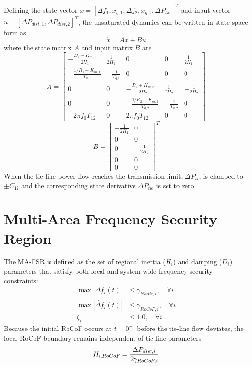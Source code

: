 \documentclass[lettersize,journal]{IEEEtran}
\begin{document}
Defining the state vector $x = [\Delta f_1, x_{g,1}, \Delta f_2, x_{g,2}, \Delta P_{tie}]^T$ and input vector $u = [\Delta P_{dist,1}, \Delta P_{dist,2}]^T$, the unsaturated dynamics can be written in state-space form as
\begin{equation}
\dot{x} = A x + B u
\end{equation}
where the state matrix $A$ and input matrix $B$ are
{\small
\begin{equation*}
A = \begin{bmatrix}
-\frac{D_1 + K_{m,1}}{2H_1} & \frac{1}{2H_1} & 0 & 0 & \frac{1}{2H_1} \\
-\frac{1/R_1 - K_{m,1}}{T_{g,1}} & -\frac{1}{T_{g,1}} & 0 & 0 & 0 \\
0 & 0 & -\frac{D_2 + K_{m,2}}{2H_2} & \frac{1}{2H_2} & -\frac{1}{2H_2} \\
0 & 0 & -\frac{1/R_2 - K_{m,2}}{T_{g,2}} & -\frac{1}{T_{g,2}} & 0 \\
-2\pi f_0 T_{12} & 0 & 2\pi f_0 T_{12} & 0 & 0
\end{bmatrix}
\end{equation*}
}
{\small
\begin{equation*}
B = \begin{bmatrix}
-\frac{1}{2H_1} & 0 \\
0 & 0 \\
0 & -\frac{1}{2H_2} \\
0 & 0 \\
0 & 0
\end{bmatrix}^T
\end{equation*}
}
When the tie-line power flow reaches the transmission limit, $\Delta P_{tie}$ is clamped to $\pm C_{12}$ and the corresponding state derivative $\dot{\Delta P}_{tie}$ is set to zero.

\vspace{-0.25cm}
\section{Multi-Area Frequency Security Region}
The MA-FSR is defined as the set of regional inertia ($H_i$) and damping ($D_i$) parameters that satisfy both local and system-wide frequency-security constraints:
\vspace{-0.15cm}
\begin{subequations}
\begin{align}
\max |\Delta f_i(t)| &\leq \gamma_{Nadir,i}, \quad \forall i \\
\max |\dot{\Delta f}_i(t)| &\leq \gamma_{RoCoF,i}, \quad \forall i \\
\zeta_i &\leq 1.0, \quad \forall i
\end{align}
\end{subequations}
Because the initial RoCoF occurs at $t = 0^+$, before the tie-line flow deviates, the local RoCoF boundary remains independent of tie-line parameters:
\vspace{-0.15cm}
\begin{equation}
H_{i,RoCoF} = \frac{\Delta P_{dist,i}}{2 \gamma_{RoCoF,i}}
\vspace{-0.15cm}
\end{equation}
\end{document}
